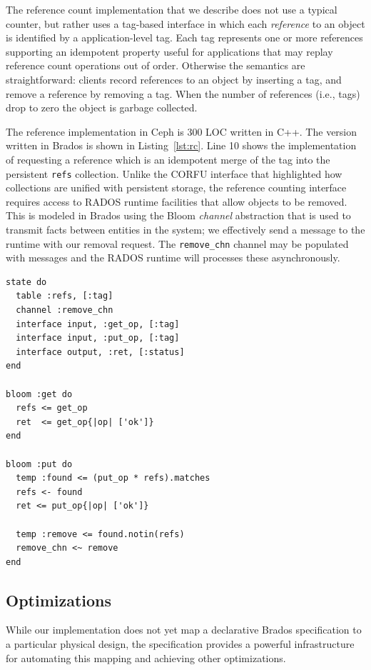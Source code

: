 \documentclass[10pt,twocolumn]{article}
\begin{document}
The reference count implementation that we describe does not use a typical
counter, but rather uses a tag-based interface in which each \emph{reference}
to an object is identified by a application-level tag. Each tag represents one
or more references supporting an idempotent property useful for applications
that may replay reference count operations out of order. Otherwise the
semantics are straightforward: clients record references to an object by
inserting a tag, and remove a reference by removing a tag. When the number of
references (i.e., tags) drop to zero the object is garbage collected.

The reference implementation in Ceph is 300 LOC written in C++. The version
written in Brados is shown in Listing~\ref{lst:rc}. Line 10 shows the
implementation of requesting a reference which is an idempotent merge of the
tag into the persistent \texttt{refs} collection.  Unlike the CORFU interface
that highlighted how collections are unified with persistent storage, the
reference counting interface requires access to RADOS runtime facilities that
allow objects to be removed. This is modeled in Brados using the Bloom
\emph{channel} abstraction that is used to transmit facts between entities in
the system; we effectively send a message to the runtime with our removal
request. The \texttt{remove\_chn} channel may be populated with messages and
the RADOS runtime will processes these asynchronously.

\begin{lstlisting}[caption={Reference counting interface}, label=lst:rc]
state do
  table :refs, [:tag]
  channel :remove_chn
  interface input, :get_op, [:tag]
  interface input, :put_op, [:tag]
  interface output, :ret, [:status]
end

bloom :get do
  refs <= get_op
  ret  <= get_op{|op| ['ok']}
end

bloom :put do
  temp :found <= (put_op * refs).matches
  refs <- found
  ret <= put_op{|op| ['ok']}

  temp :remove <= found.notin(refs)	
  remove_chn <~ remove
end
\end{lstlisting}

\subsection{Optimizations}

While our implementation does not yet map a declarative Brados specification
to a particular physical design, the specification provides a powerful
infrastructure for automating this mapping and achieving other optimizations.
\end{document}
